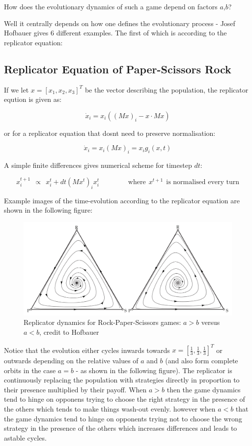 \documentclass[journal,article,accept,oneauthors,pdftex,10pt,a4paper]{mdpi}
\begin{document}
How does the evolutionary dynamics of such a game depend on factors $a$,$b$?

Well it centrally depends on how one defines the evolutionary process - Josef Hofbauer gives 6 different examples.\cite{psr1} The first of which is according to the replicator equation:

\subsection{Replicator Equation of Paper-Scissors Rock}

If we let $x = [x_1,x_2,x_3]^T$ be the vector describing the population, the replicator eqution is given as:

$$\dot{x}_i=x_i((Mx)_i-x\cdot M x)$$

or for a replicator equation that dosnt need to preserve normalisation:

$$\dot{x}_i=x_i(Mx)_i=x_ig_i(x,t)$$

A simple finite differences gives numerical scheme for timestep $dt$:

$$x^{t+1}_i~~\propto ~~x^{t}_i+dt(Mx^{t})_ix^{t}_i~~~~~~~~~~~~~~~~~~~\text{where}~~x^{t+1}~~\text{is normalised every turn}$$

Example images of the time-evolution according to the replicator equation are shown in the following figure:

\begin{figure}[ht]
\centering
\includegraphics[width=0.8\linewidth]{rps1}
\caption{Replicator dynamics for Rock-Paper-Scissors games:
$a>b$ versus $a<b$, credit to Hofbauer\cite{psr1}}
\label{fig:states}
\end{figure}

Notice that the evolution either cycles inwards towards $x=[\frac{1}{3},\frac{1}{3},\frac{1}{3}]^T$ or outwards depending on the relative values of $a$ and $b$ (and also form complete orbits in the case $a=b$ - as shown in the following figure).
The replicator is continuously replacing the population with strategies directly in proportion to their presence multiplied by their payoff.
When $a>b$ then the game dynamics tend to hinge on opponens trying to choose the right strategy in the presence of the others which tends to make things wash-out evenly.
however when $a<b$ that the game dynamics tend to hinge on opponents trying not to choose the wrong strategy in the presence of the others which increases differences and leads to astable cycles.
\end{document}
